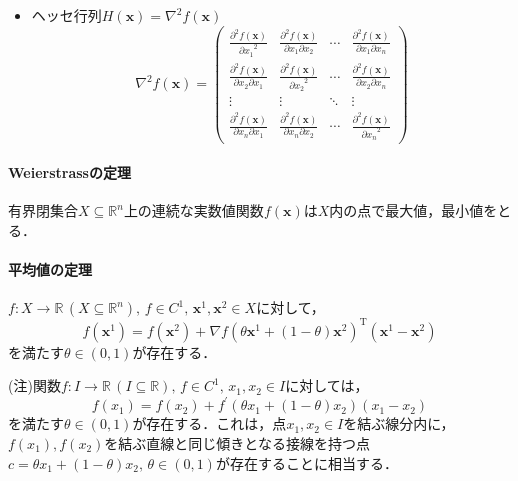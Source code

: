 \documentclass{jsreport}
\begin{document}
\begin{itemize}
\begin{equation}
    \end{equation}
  \item ヘッセ行列$H(\bm{x}) = \nabla^2 f(\bm{x})$
  \begin{equation}
    \nabla^2 f(\bm{x}) = \left(
    \begin{array}{cccc}
      \displaystyle \frac{\partial^2 f(\bm{x})}{{\partial x_1}^2} & \displaystyle \frac{\partial^2 f(\bm{x})}{\partial x_1 \partial x_2} & \displaystyle \cdots & \displaystyle \frac{\partial^2 f(\bm{x})}{\partial x_1 \partial x_n} \\
      \displaystyle \frac{\partial^2 f(\bm{x})}{\partial x_2 \partial x_1} & \displaystyle \frac{\partial^2 f(\bm{x})}{{\partial x_2}^2} & \displaystyle \cdots & \displaystyle \frac{\partial^2 f(\bm{x})}{\partial x_2 \partial x_n} \\
      \vdots & \vdots & \ddots & \vdots \\
      \displaystyle \frac{\partial^2 f(\bm{x})}{\partial x_n \partial x_1} & \displaystyle \frac{\partial^2 f(\bm{x})}{\partial x_n \partial x_2} & \displaystyle \cdots & \displaystyle \frac{\partial^2 f(\bm{x})}{{\partial x_n}^2}
    \end{array}
    \right) \nonumber
  \end{equation}
\end{itemize}

\paragraph{Weierstrassの定理}
有界閉集合$X \subseteq \mathbb{R}^n$上の連続な実数値関数$f(\bm{x})$は$X$内の点で最大値，最小値をとる．

\paragraph{平均値の定理}
$f: X \rightarrow \mathbb{R} \, (X \subseteq \mathbb{R}^n), \, f \in C^1, \, \bm{x}^1, \bm{x}^2 \in X$に対して，
\begin{equation}
  f(\bm{x}^1) = f(\bm{x}^2) + \nabla f(\theta \bm{x}^1 + (1 - \theta) \bm{x}^2)^{\mathrm{T}}(\bm{x}^1 - \bm{x}^2) \nonumber
\end{equation}
を満たす$\theta \in (0, 1)$が存在する．

(注)関数$f: I \rightarrow \mathbb{R} \, (I \subseteq \mathbb{R}), \, f \in C^1, \, x_1, x_2 \in I$に対しては，
\begin{equation}
  f(x_1) = f(x_2) + f^{\prime}(\theta x_1 + (1-\theta)x_2)(x_1 - x_2) \nonumber
\end{equation}
を満たす$\theta \in (0, 1)$が存在する．これは，点$x_1, x_2 \in I$を結ぶ線分内に，$f(x_1), f(x_2)$を結ぶ直線と同じ傾きとなる接線を持つ点$c = \theta x_1 + (1-\theta)x_2, \, \theta \in (0, 1)$が存在することに相当する．
\end{document}
